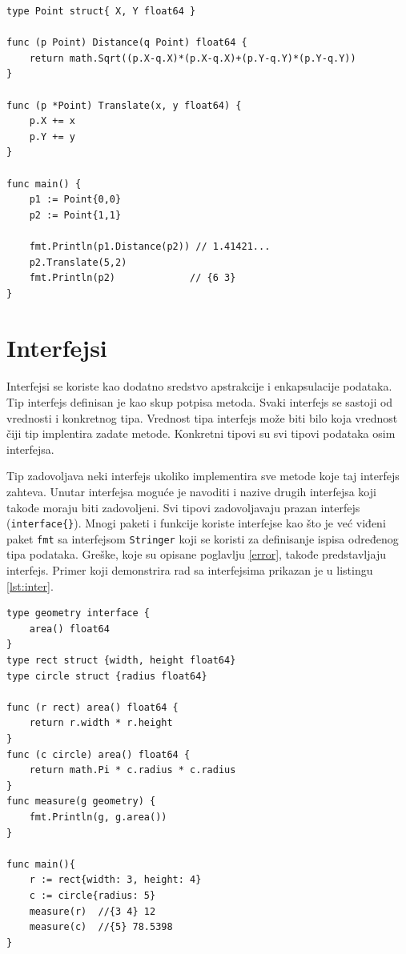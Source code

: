 \documentclass[12pt,oneside]{memoir}
\begin{document}
\begin{center}
\begin{lstlisting}[caption=Primer koji demonstrira rad sa metodima, label={lst:metod},  backgroundcolor=\color{background}]
type Point struct{ X, Y float64 }

func (p Point) Distance(q Point) float64 {
	return math.Sqrt((p.X-q.X)*(p.X-q.X)+(p.Y-q.Y)*(p.Y-q.Y))
}

func (p *Point) Translate(x, y float64) {
	p.X += x
	p.Y += y
}

func main() {
	p1 := Point{0,0}
	p2 := Point{1,1}

	fmt.Println(p1.Distance(p2)) // 1.41421...
	p2.Translate(5,2)
	fmt.Println(p2)				// {6 3}
}
\end{lstlisting}
\end{center}

\section{Interfejsi}

Interfejsi se koriste kao dodatno sredstvo apstrakcije i enkapsulacije podataka. Tip interfejs definisan je kao skup potpisa metoda. Svaki interfejs se sastoji od vrednosti i konkretnog tipa. Vrednost tipa interfejs može biti bilo koja vrednost čiji tip implentira zadate metode. Konkretni tipovi su svi tipovi podataka osim interfejsa.

Tip zadovoljava neki interfejs ukoliko implementira sve metode koje taj interfejs zahteva. Unutar interfejsa moguće je navoditi i nazive drugih interfejsa koji takođe moraju biti zadovoljeni. Svi tipovi zadovoljavaju prazan interfejs (\texttt{interface\{\}}). Mnogi paketi i funkcije koriste interfejse kao što je već viđeni paket \texttt{fmt} sa interfejsom \texttt{Stringer} koji se koristi za definisanje ispisa određenog tipa podataka. Greške, koje su opisane poglavlju \ref{error}, takođe predstavljaju interfejs. Primer koji demonstrira rad sa interfejsima prikazan je u listingu \ref{lst:inter}.

\begin{center}
\begin{lstlisting}[caption=Primer koji demonstrira rad sa interfejsima, label={lst:inter},  backgroundcolor=\color{background}]
type geometry interface { 
	area() float64 
}
type rect struct {width, height float64}
type circle struct {radius float64}

func (r rect) area() float64 {
	return r.width * r.height
}
func (c circle) area() float64 {
	return math.Pi * c.radius * c.radius
}
func measure(g geometry) {
	fmt.Println(g, g.area())
}

func main(){
	r := rect{width: 3, height: 4}	
	c := circle{radius: 5}			
	measure(r)	//{3 4} 12 
  	measure(c)	//{5} 78.5398 
}
\end{lstlisting}
\end{center}
\end{document}
